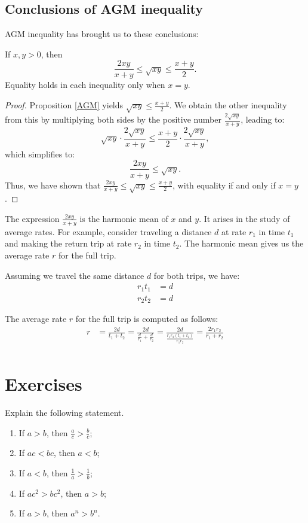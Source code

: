 \documentclass[
	12pt, %
	fleqn, %
	a4paper, %
]{LegrandOrangeBook}
\begin{document}
\subsection*{Conclusions of AGM inequality}
AGM inequality has brought us to these conclusions:
    \begin{corollary}
If $x, y > 0$, then
\[\frac{2xy}{x+y} \leq \sqrt{xy} \leq \frac{x+y}{2}.\]
Equality holds in each inequality only when $x = y$.
\end{corollary}

\begin{proof}
Proposition \ref{AGM} yields $\sqrt{xy} \leq \frac{x+y}{2}$. We obtain the other inequality from this by multiplying both sides by the positive number $\frac{2\sqrt{xy}}{x+y}$, leading to:
\[\sqrt{xy} \cdot \frac{2\sqrt{xy}}{x+y} \leq \frac{x+y}{2} \cdot \frac{2\sqrt{xy}}{x+y},\]
which simplifies to:
\[\frac{2xy}{x+y} \leq \sqrt{xy}.\]
Thus, we have shown that $\frac{2xy}{x+y} \leq \sqrt{xy} \leq \frac{x+y}{2}$, with equality if and only if $x = y$.
\end{proof}
The expression $\frac{2xy}{x+y}$ is the harmonic mean of $x$ and $y$. It arises in the study of average rates. For example, consider traveling a distance $d$ at rate $r_1$ in time $t_1$ and making the return trip at rate $r_2$ in time $t_2$. The harmonic mean gives us the average rate $r$ for the full trip.

Assuming we travel the same distance $d$ for both trips, we have:
\begin{align*}
r_1t_1 &= d \\
r_2t_2 &= d
\end{align*}

The average rate $r$ for the full trip is computed as follows:
\begin{align*}
r &= \frac{2d}{t_1 + t_2} = \frac{2d}{\frac{d}{r_1} + \frac{d}{r_2}} = \frac{2d}{\frac{r_1r_2(t_1 + t_2)}{r_1r_2}} =\frac{2r_1r_2}{r_1 + r_2}\\
\end{align*}
\section{Exercises}
\begin{exercise}
    Explain the following statement.
    \begin{enumerate}
        \item If \( a > b \), then \( \frac{a}{c} > \frac{b}{c} \);
        \item If \( ac < bc \), then \( a < b \);
        \item If \( a < b \), then \( \frac{1}{a} > \frac{1}{b} \);
        \item If \( ac^2 > bc^2 \), then \( a > b \);
        \item If \( a > b \), then \( a^n > b^n \).
    \end{enumerate}
\end{exercise}
\end{document}

